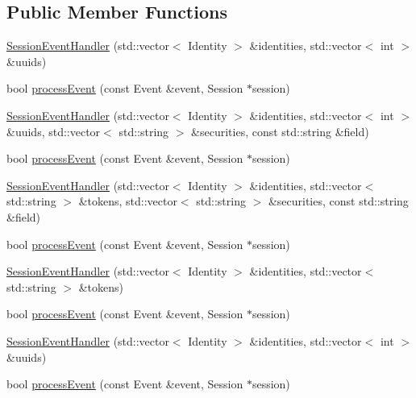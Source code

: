 \subsection*{Public Member Functions}
\begin{DoxyCompactItemize}
\item 
\hyperlink{class_session_event_handler_ae31656c34c31f44dc456b23ee2ad7887}{Session\+Event\+Handler} (std\+::vector$<$ Identity $>$ \&identities, std\+::vector$<$ int $>$ \&uuids)
\item 
bool \hyperlink{class_session_event_handler_a084fa03586ec047c78600cea54a91355}{process\+Event} (const Event \&event, Session $\ast$session)
\item 
\hyperlink{class_session_event_handler_a12e1d80c3612273172d6d4c0e1776901}{Session\+Event\+Handler} (std\+::vector$<$ Identity $>$ \&identities, std\+::vector$<$ int $>$ \&uuids, std\+::vector$<$ std\+::string $>$ \&securities, const std\+::string \&field)
\item 
bool \hyperlink{class_session_event_handler_a084fa03586ec047c78600cea54a91355}{process\+Event} (const Event \&event, Session $\ast$session)
\item 
\hyperlink{class_session_event_handler_ab949db928e8f10779e46cb76bcb0ce7e}{Session\+Event\+Handler} (std\+::vector$<$ Identity $>$ \&identities, std\+::vector$<$ std\+::string $>$ \&tokens, std\+::vector$<$ std\+::string $>$ \&securities, const std\+::string \&field)
\item 
bool \hyperlink{class_session_event_handler_a084fa03586ec047c78600cea54a91355}{process\+Event} (const Event \&event, Session $\ast$session)
\item 
\hyperlink{class_session_event_handler_a5b53b782cee510f58ff8d5e79864cabe}{Session\+Event\+Handler} (std\+::vector$<$ Identity $>$ \&identities, std\+::vector$<$ std\+::string $>$ \&tokens)
\item 
bool \hyperlink{class_session_event_handler_a084fa03586ec047c78600cea54a91355}{process\+Event} (const Event \&event, Session $\ast$session)
\item 
\hyperlink{class_session_event_handler_ae31656c34c31f44dc456b23ee2ad7887}{Session\+Event\+Handler} (std\+::vector$<$ Identity $>$ \&identities, std\+::vector$<$ int $>$ \&uuids)
\item 
bool \hyperlink{class_session_event_handler_a084fa03586ec047c78600cea54a91355}{process\+Event} (const Event \&event, Session $\ast$session)
\end{DoxyCompactItemize}


